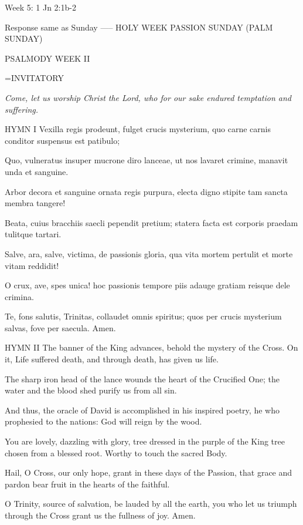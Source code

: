 Week 5:    1 Jn 2:1b-2    

Response same as Sunday
-----
HOLY WEEK
PASSION SUNDAY
(PALM SUNDAY)

PSALMODY WEEK II

\hangindent=\parindent \small{INVITATORY}
\begin{center}
\textit{Come, let us worship Christ the Lord, who for our sake endured temptation and suffering.\\}
\end{center}

HYMN I
Vexilla regis prodeunt,
fulget crucis mysterium,
quo carne carnis conditor
suspensus est patibulo;

Quo, vulneratus insuper 
mucrone diro lanceae,
ut nos lavaret crimine,
manavit unda et sanguine.

Arbor decora et sanguine
ornata regis purpura,
electa digno stipite
tam sancta membra tangere!

Beata, cuius bracchiis
saecli pependit pretium;
statera facta est corporis
praedam tulitque tartari.

Salve, ara, salve, victima,
de passionis gloria,
qua vita mortem pertulit
et morte vitam reddidit!

O crux, ave, spes unica!
hoc passionis tempore
piis adauge gratiam
reisque dele crimina.

Te, fons salutis, Trinitas,
collaudet omnis spiritus;
quos per crucis mysterium
salvas, fove per saecula. Amen.

HYMN II
The banner of the King advances,
behold the mystery of the Cross.
On it, Life suffered death,
and through death, has given us life.

The sharp iron head of the lance
wounds the heart of the Crucified One;
the water and the blood shed
purify us from all sin.

And thus, the oracle of David is accomplished
in his inspired poetry,
he who prophesied to the nations:
God will reign by the wood.

You are lovely, dazzling with glory,
tree dressed in the purple of the King
tree chosen from a blessed root.
Worthy to touch the sacred Body.

Hail, O Cross, our only hope,
grant in these days of the Passion,
that grace and pardon bear fruit
in the hearts of the faithful.

O Trinity, source of salvation,
be lauded by all the earth,
you who let us triumph through the Cross
grant us the fullness of joy. Amen.

